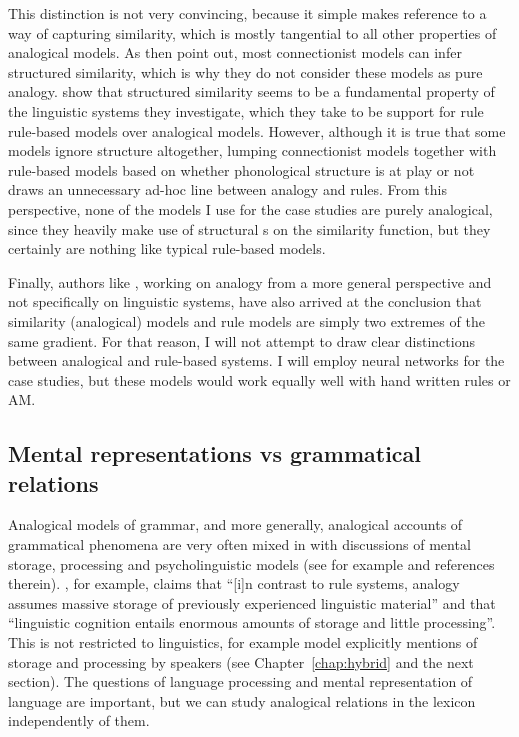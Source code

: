 This distinction is not very convincing, because it simple makes reference to a way of capturing similarity, which is mostly tangential to all other properties of analogical models. As \textcite[5]{Albright.2003} then point out, most connectionist models can infer structured similarity, which is why they do not consider these models as pure analogy. \textcite{Albright.2003} show that structured similarity seems to be a fundamental property of the linguistic systems they investigate, which they take to be support for rule rule-based models over analogical models. However, although it is true that some models ignore structure altogether, lumping connectionist models together with rule-based models based on whether phonological structure is at play or not draws an unnecessary ad-hoc line  between analogy and rules. From this perspective, none of the models I use for the case studies are purely analogical, since they heavily make use of structural s on the similarity function, but they certainly are nothing like typical rule-based models.

Finally, authors like \textcite{Pothos.2005}, working on analogy from a more general perspective and not specifically on linguistic systems, have also arrived at the conclusion that similarity (analogical) models and rule models are simply two extremes of the same gradient. For that reason, I will not attempt to draw clear distinctions between analogical and rule-based systems. I will employ neural networks for the case studies, but these models would work equally well with hand written rules or AM.

\subsection{Mental representations vs grammatical relations}

\largerpage
Analogical models of grammar, and more generally, analogical accounts of grammatical phenomena are very often mixed in with discussions of mental storage, processing and psycholinguistic models (see for example \cite{Bybee.2010} and references therein). \textcite[419--420]{Eddington.2009}, for example, claims that ``[i]n contrast to rule systems, analogy assumes massive storage of previously experienced linguistic material'' and that ``linguistic cognition entails enormous amounts of storage and little processing''. This is not restricted to  linguistics, for example  model explicitly mentions of storage and processing by speakers (see Chapter~\ref{chap:hybrid} and the next section). The questions of language processing and mental representation of language are important, but we can study analogical relations in the lexicon independently of them.

